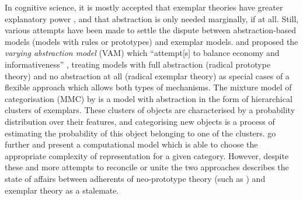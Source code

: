 In cognitive science, it is mostly accepted that exemplar theories have greater explanatory power \citep[184]{Vanpaemel2016}, and that abstraction is only needed marginally, if at all.
Still, various attempts have been made to settle the dispute between abstraction-based models (models with rules or prototypes) and exemplar models.
\citet{VanpaemelStorms2008} and \citet{LeeVanpaemel2008} proposed the \textit{varying abstraction model} (VAM) which ``attempt[s] to balance economy and informativeness'' \citep[745]{LeeVanpaemel2008}, treating models with full abstraction (radical prototype theory) and no abstraction at all (radical exemplar theory) as special cases of a flexible approach which allows both types of mechanisms.
The mixture model of categorisation (MMC) by \citet{Rosseel2002} is a model with abstraction in the form of hierarchical clusters of exemplars.
These clusters of objects are characterised by a probability distribution over their features, and categorising new objects is a process of estimating the probability of this object belonging to one of the clusters.
\citet{GriffithsEa2009} go further and present a computational model which is able to choose the appropriate complexity of representation for a given category.
However, despite these and more attempts to reconcile or unite the two approaches \citet[183--184]{Vanpaemel2016} describes the state of affairs between adherents of neo-prototype theory (such as \citealp{MindaSmith2001,MindaSmith2002}) and exemplar theory as a stalemate.



